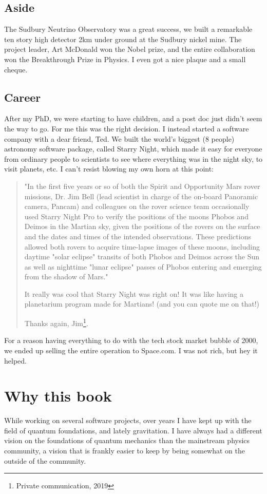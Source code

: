 \documentclass[../rzero]{subfiles}
\begin{document}
\subsection*{Aside}
The Sudbury Neutrino Observatory was a great success, we built a remarkable ten story high detector 2km under ground at the Sudbury nickel mine. The project leader, Art McDonald won the Nobel prize, and the entire collaboration won the Breakthrough Prize in Physics. I even got a nice plaque and a small cheque.

\subsection*{Career}
After my PhD, we were starting to have children, and a post doc just didn't seem the way to go. For me this was the right decision. I instead started a software company with a dear friend, Ted. We built the world's biggest (8 people) astronomy software package, called Starry Night, which made it easy for everyone from ordinary people to scientists to see where everything was in the night sky, to visit planets, etc. I can't resist blowing my own horn at this point:
\begin{quotation}
	"In the first five years or so of both the Spirit and Opportunity Mars rover missions, Dr. Jim Bell (lead scientist in charge of the on-board Panoramic camera, Pancam) and colleagues on the rover science team occasionally used Starry Night Pro to verify the positions of the moons Phobos and Deimos in the Martian sky, given the positions of the rovers on the surface and the dates and times of the intended observations. These predictions allowed both rovers to acquire time-lapse images of these moons, including daytime "solar eclipse" transits of both Phobos and Deimos across the Sun as well as nighttime "lunar eclipse" passes of Phobos entering and emerging from the shadow of Mars."
 
It really was cool that Starry Night was right on!  It was like having a planetarium program made for Martians!   (and you can quote me on that!)
 
Thanks again,
Jim\footnote{Private communication, 2019}.
\end{quotation} 

For a reason having everything to do with the tech stock market bubble of 2000, we ended up selling the entire operation to Space.com. I was not rich, but hey it helped. 



\section*{Why this book}
While working on several software projects, over years I have kept up with the field of quantum foundations, and lately gravitation. I have always had a different vision on the foundations of quantum mechanics than the mainstream physics community, a vision that is frankly easier to keep by being somewhat on the outside of the community.  
\end{document}
